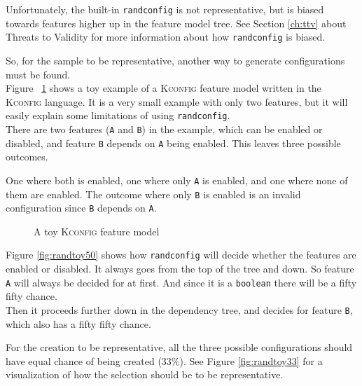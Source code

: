 \documentclass[a4paper,11pt]{report}
\newcommand{\figa}{
    \begin{figure}[!htpb]
    \centering
}
\newcommand{\figb}[2]{
    \caption{#1}
    \label{#2}
    \end{figure}
}
\begin{document}
Unfortunately, the built-in \texttt{randconfig} is not representative, but is 
biased towards features higher up in the feature model tree. See Section 
\ref{ch:ttv} about Threats to Validity for more information about how 
\texttt{randconfig} is biased.

So, for the sample to be representative, another way to generate configurations 
must be found.
\\

Figure ~\ref{randconfigtoy} shows a toy example of a \textsc{Kconfig} feature 
model written in the \textsc{Kconfig} language.  It is a very small example 
with only two features, but it will easily explain some limitations of using 
\texttt{randconfig}.
\\

There are two features (\texttt{A} and \texttt{B}) in the example, which can be 
enabled or disabled, and feature \texttt{B} depends on \texttt{A} being enabled.
This leaves three possible outcomes. 

One where both is enabled, one where only \texttt{A} is enabled, and one where 
none of them are enabled. The outcome where only \texttt{B} is enabled is an 
invalid configuration since \texttt{B} depends on \texttt{A}.

\figa
    
\figb{A toy \textsc{Kconfig} feature model}{randconfigtoy}

Figure \ref{fig:randtoy50} shows how \texttt{randconfig} will decide whether 
the features are enabled or disabled. It always goes from the top of the tree 
and down. So feature \texttt{A} will always be decided for at first. And since 
it is a \texttt{boolean} there will be a fifty fifty chance.
\\

Then it proceeds further down in the dependency tree, and decides for feature
\texttt{B}, which also has a fifty fifty chance.

For the creation to be representative, all the three possible configurations 
should have equal chance of being created (33\%). See Figure 
\ref{fig:randtoy33} for a visualization of how the selection should 
be to be representative.
\end{document}
